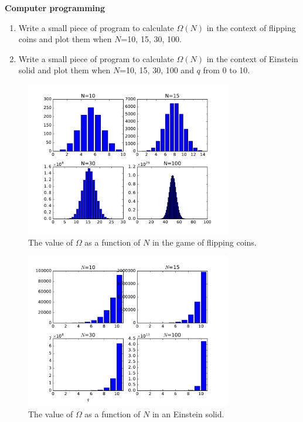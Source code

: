 {\bf Computer programming}
\begin{enumerate}
\item Write a small piece of program to calculate $\Omega(N)$ in the context of flipping coins and plot them when $N$=10, 15, 30, 100.
\item Write a small piece of program to calculate $\Omega(N)$ in the context of Einstein solid and plot them when $N$=10, 15, 30, 100 and $q$ from 0 to 10.
\end{enumerate}

\begin{figure}[h]
\centering
\includegraphics[width=9cm]{imgs/flip}
\caption{The value of $\Omega$ as a function of $N$ in the game of flipping coins. }
\end{figure}

\begin{figure}[h]
\centering
\includegraphics[width=9cm]{imgs/Einstein0}
\caption{The value of $\Omega$ as a function of $N$ in an Einstein solid. }
\end{figure}


